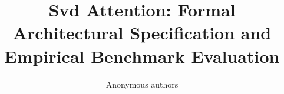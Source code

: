 \title{\textbf{Svd Attention: Formal Architectural Specification and Empirical Benchmark Evaluation}}

\author{Anonymous authors}

